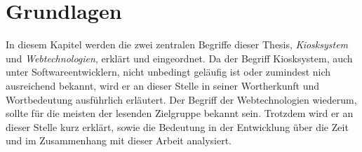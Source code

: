 \chapter{Grundlagen}
\label{chap:grundlagen}

In diesem Kapitel werden die zwei zentralen Begriffe dieser Thesis, \emph{Kiosksystem} und
\emph{Webtechnologien}, erklärt und eingeordnet. Da der Begriff
Kiosksystem, auch unter Softwareentwicklern, nicht unbedingt geläufig ist oder
zumindest nich ausreichend bekannt, wird er an dieser Stelle in seiner Wortherkunft
und Wortbedeutung ausführlich erläutert. Der Begriff der Webtechnologien wiederum, sollte
für die meisten der lesenden Zielgruppe bekannt sein. Trotzdem wird er an dieser Stelle kurz erklärt, sowie
die Bedeutung in der Entwicklung über die Zeit und im Zusammenhang mit dieser Arbeit
analysiert.


